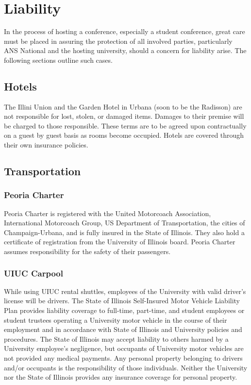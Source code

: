 \section{Liability}
In the process of hosting a conference, especially a student conference, great care must be placed in assuring the protection of all involved parties, particularly ANS National and the hosting university,  should a concern for liability arise. The following sections outline such cases.



\subsection{Hotels}
The Illini Union and the Garden Hotel in Urbana (soon to be the Radisson) are not responsible for lost, stolen, or damaged items. Damages to their premise will be charged to those responsible. These terms are to be agreed upon contractually on a guest by guest basis as rooms become occupied. Hotels are covered through their own insurance policies.



\subsection{Transportation}

\subsubsection{Peoria Charter}
Peoria Charter is registered with the United Motorcoach Association, International Motorcoach Group, US Department of Transportation, the cities of Champaign-Urbana, and is fully insured in the State of Illinois. They also hold a certificate of registration from the University of Illinois board. Peoria Charter assumes responsibility for the safety of their passengers.

\subsubsection{UIUC Carpool}
While using UIUC rental shuttles, employees of the University with valid driver’s license will be drivers. The State of Illinois Self-Insured Motor Vehicle Liability Plan provides liability coverage to full-time, part-time, and student employees or student trustees operating a University motor vehicle in the course of their employment and in accordance with State of Illinois and University policies and procedures. The State of Illinois may accept liability to others harmed by a University employee's negligence, but occupants of University motor vehicles are not provided any medical payments. Any personal property belonging to drivers and/or occupants is the responsibility of those individuals. Neither the University nor the State of Illinois provides any insurance coverage for personal property.

